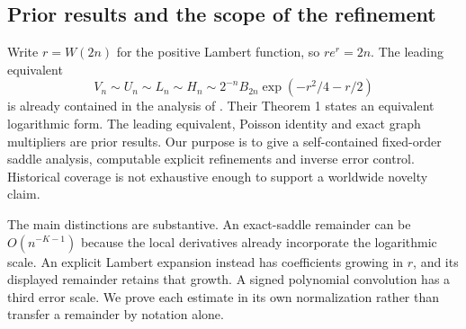 \subsection{Prior results and the scope of the refinement}
Write $r=W(2n)$ for the positive Lambert function, so $re^r=2n$. The leading equivalent
\begin{equation}\label{tcl:eq:known}
V_n\sim U_n\sim L_n\sim H_n\sim 2^{-n}B_{2n}\exp(-r^2/4-r/2)
\end{equation}
is already contained in the analysis of \cite[pp.~17--19, equations (21)--(27)]{cps}. Their Theorem 1 states an equivalent logarithmic form. The leading equivalent, Poisson identity and exact graph multipliers are prior results. Our purpose is to give a self-contained fixed-order saddle analysis, computable explicit refinements and inverse error control. Historical coverage is not exhaustive enough to support a worldwide novelty claim.

The main distinctions are substantive. An exact-saddle remainder can be $O(n^{-K-1})$ because the local derivatives already incorporate the logarithmic scale. An explicit Lambert expansion instead has coefficients growing in $r$, and its displayed remainder retains that growth. A signed polynomial convolution has a third error scale. We prove each estimate in its own normalization rather than transfer a remainder by notation alone.

